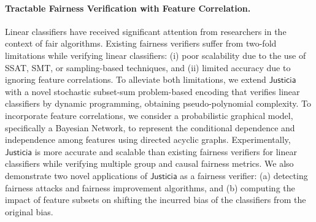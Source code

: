 \documentclass{article}
\begin{document}
\paragraph{Tractable Fairness Verification with Feature Correlation.} Linear classifiers have received significant attention from researchers in the context of fair algorithms. Existing fairness verifiers suffer from two-fold limitations while verifying linear classifiers: (i) poor scalability due to the use of SSAT, SMT, or sampling-based techniques, and (ii) limited accuracy due to ignoring feature correlations. To alleviate both limitations, we extend $\mathsf{Justicia}$ with a novel stochastic subset-sum problem-based encoding that verifies linear classifiers by dynamic programming, obtaining pseudo-polynomial complexity. To incorporate feature correlations, we consider a probabilistic graphical model, specifically a Bayesian Network, to represent the conditional dependence and independence among features using directed acyclic graphs. Experimentally, $\mathsf{Justicia}$ is more accurate and scalable than existing fairness verifiers for linear classifiers while verifying multiple group and causal fairness metrics. We also demonstrate two novel applications of $\mathsf{Justicia}$ as a fairness verifier: (a) detecting fairness attacks and fairness improvement algorithms, and (b) computing the impact of feature subsets on shifting the incurred bias of the classifiers from the original bias.
\end{document}
